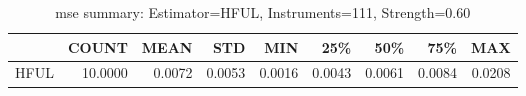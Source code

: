 \begin{table}[ht]
\centering
\caption{mse summary: Estimator=HFUL, Instruments=111, Strength=0.60}
\begin{tabular}{lrrrrrrrr}
\toprule
 & COUNT & MEAN & STD & MIN & 25\% & 50\% & 75\% & MAX \\
\midrule
HFUL & 10.0000 & 0.0072 & 0.0053 & 0.0016 & 0.0043 & 0.0061 & 0.0084 & 0.0208 \\
\bottomrule
\end{tabular}
\end{table}
